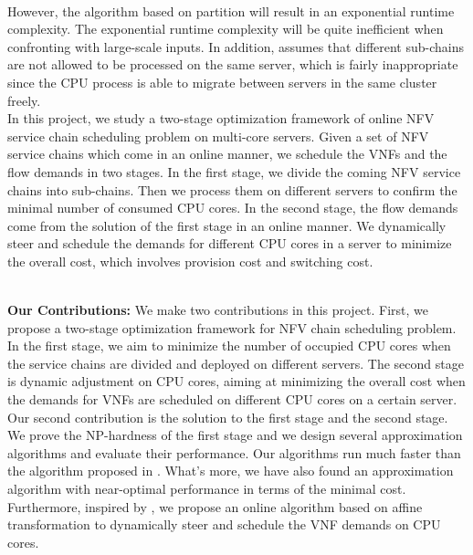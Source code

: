 \documentclass{acmtog}
\begin{document}
\\\indent However, the algorithm based on partition will result in  an exponential runtime complexity. The exponential runtime complexity will be quite inefficient when confronting with large-scale inputs. In addition, \cite{c1} assumes that different sub-chains are not allowed to be processed on the same server, which is fairly inappropriate since the CPU process is able to migrate between servers in the same cluster freely.
\\\indent In this project, we study a two-stage optimization framework of online NFV service chain scheduling problem on multi-core servers. Given a set of NFV service chains which come in an online manner, we schedule the VNFs and the flow demands in two stages. In the first stage, we divide the coming NFV service chains into sub-chains. Then we process them on different servers to confirm the minimal number of consumed CPU cores. In the second stage, the flow demands come from the solution of the first stage in an online manner. We dynamically steer and schedule the demands for different CPU cores in a server to minimize the overall cost, which involves provision cost and switching cost.


\vspace{1ex}
\\\noindent\textbf{Our Contributions: } We make two contributions in this project. First, we propose a two-stage optimization framework for NFV chain scheduling problem. In the first stage, we aim to minimize the number of occupied CPU cores when the service chains are divided and deployed on different servers. The second stage is dynamic adjustment on CPU cores, aiming at minimizing the overall cost when the demands for VNFs are scheduled on different CPU cores on a certain server.
\\\indent Our second contribution is the solution to the first stage and the second stage. We prove the NP-hardness of the first stage and we design several approximation algorithms and evaluate their performance. Our algorithms run much faster than the algorithm proposed in \cite{c1}. What's more, we have also found an approximation algorithm with near-optimal performance in terms of the minimal cost. Furthermore, inspired by \cite{c3}, we propose an online algorithm based on affine transformation to dynamically steer and schedule the VNF demands on CPU cores.
\end{document}
